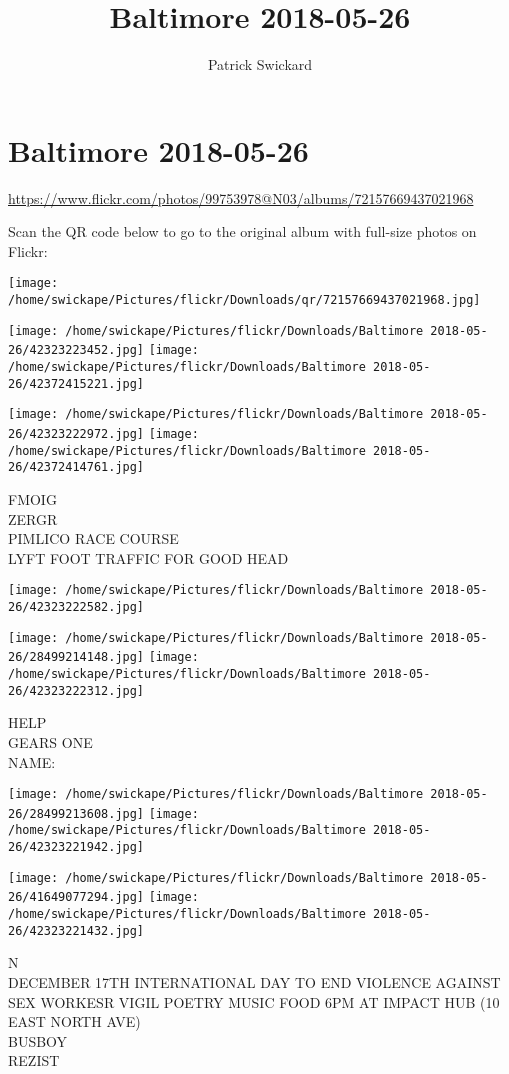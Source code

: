 \documentclass[10pt,letterpaper]{article}
\title{Baltimore 2018-05-26}
\author{Patrick Swickard}
\date{}
\begin{document}
\section*{Baltimore 2018-05-26}

\url{https://www.flickr.com/photos/99753978@N03/albums/72157669437021968}

Scan the QR code below to go to the original album with full-size photos on Flickr:

\texttt{[image: /home/swickape/Pictures/flickr/Downloads/qr/72157669437021968.jpg]}
\pagebreak

\texttt{[image: /home/swickape/Pictures/flickr/Downloads/Baltimore 2018-05-26/42323223452.jpg]}
\texttt{[image: /home/swickape/Pictures/flickr/Downloads/Baltimore 2018-05-26/42372415221.jpg]}

\texttt{[image: /home/swickape/Pictures/flickr/Downloads/Baltimore 2018-05-26/42323222972.jpg]}
\texttt{[image: /home/swickape/Pictures/flickr/Downloads/Baltimore 2018-05-26/42372414761.jpg]}

FMOIG\\
ZERGR\\
PIMLICO RACE COURSE\\
LYFT FOOT TRAFFIC FOR GOOD HEAD
\pagebreak

\texttt{[image: /home/swickape/Pictures/flickr/Downloads/Baltimore 2018-05-26/42323222582.jpg]}

\vspace{0.25in}
\texttt{[image: /home/swickape/Pictures/flickr/Downloads/Baltimore 2018-05-26/28499214148.jpg]}
\texttt{[image: /home/swickape/Pictures/flickr/Downloads/Baltimore 2018-05-26/42323222312.jpg]}

HELP\\
GEARS ONE\\
NAME:
\pagebreak

\texttt{[image: /home/swickape/Pictures/flickr/Downloads/Baltimore 2018-05-26/28499213608.jpg]}
\texttt{[image: /home/swickape/Pictures/flickr/Downloads/Baltimore 2018-05-26/42323221942.jpg]}

\texttt{[image: /home/swickape/Pictures/flickr/Downloads/Baltimore 2018-05-26/41649077294.jpg]}
\texttt{[image: /home/swickape/Pictures/flickr/Downloads/Baltimore 2018-05-26/42323221432.jpg]}

N\\
DECEMBER 17TH INTERNATIONAL DAY TO END VIOLENCE AGAINST SEX WORKESR VIGIL POETRY MUSIC FOOD 6PM AT IMPACT HUB (10 EAST NORTH AVE)\\
BUSBOY\\
REZIST
\pagebreak
\end{document}

